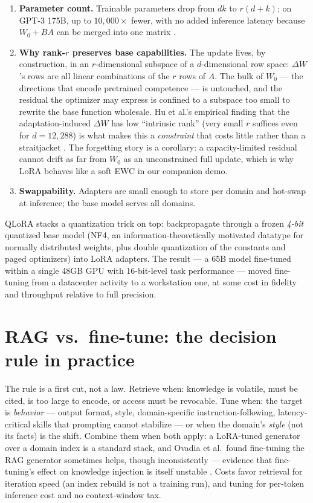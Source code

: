 \documentclass[11pt]{article}
\begin{document}
\begin{enumerate}[noitemsep]
  \item \textbf{Parameter count.} Trainable parameters drop from $dk$ to $r(d+k)$; on GPT-3 175B, up to $10{,}000\times$ fewer, with no added inference latency because $W_0 + BA$ can be merged into one matrix \cite{hu2022lora}.
  \item \textbf{Why rank-$r$ preserves base capabilities.} The update lives, by construction, in an $r$-dimensional subspace of a $d$-dimensional row space: $\Delta W$'s rows are all linear combinations of the $r$ rows of $A$. The bulk of $W_0$ --- the directions that encode pretrained competence --- is untouched, and the residual the optimizer may express is confined to a subspace too small to rewrite the base function wholesale. Hu et al.'s empirical finding that the adaptation-induced $\Delta W$ has low ``intrinsic rank'' (very small $r$ suffices even for $d = 12{,}288$) is what makes this a \emph{constraint} that costs little rather than a straitjacket \cite{hu2022lora}. The forgetting story is a corollary: a capacity-limited residual cannot drift as far from $W_0$ as an unconstrained full update, which is why LoRA behaves like a soft EWC in our companion demo.
  \item \textbf{Swappability.} Adapters are small enough to store per domain and hot-swap at inference; the base model serves all domains.
\end{enumerate}

QLoRA \cite{dettmers2023qlora} stacks a quantization trick on top: backpropagate through a frozen \emph{4-bit} quantized base model (NF4, an information-theoretically motivated datatype for normally distributed weights, plus double quantization of the constants and paged optimizers) into LoRA adapters. The result --- a 65B model fine-tuned within a single 48GB GPU with 16-bit-level task performance --- moved fine-tuning from a datacenter activity to a workstation one, at some cost in fidelity and throughput relative to full precision.

\section{RAG vs.\ fine-tune: the decision rule in practice}
The rule is a first cut, not a law. Retrieve when: knowledge is volatile, must be cited, is too large to encode, or access must be revocable. Tune when: the target is \emph{behavior} --- output format, style, domain-specific instruction-following, latency-critical skills that prompting cannot stabilize --- or when the domain's \emph{style} (not its facts) is the shift. Combine them when both apply: a LoRA-tuned generator over a domain index is a standard stack, and Ovadia et al.\ found fine-tuning the RAG generator sometimes helps, though inconsistently --- evidence that fine-tuning's effect on knowledge injection is itself unstable \cite{ovadia2024fine}. Costs favor retrieval for iteration speed (an index rebuild is not a training run), and tuning for per-token inference cost and no context-window tax.
\end{document}
